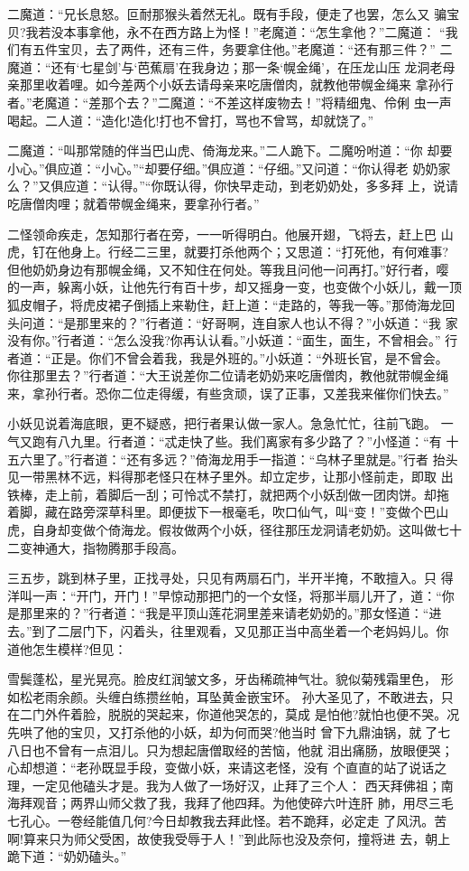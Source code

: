 二魔道：“兄长息怒。叵耐那猴头着然无礼。既有手段，便走了也罢，怎么又
骗宝贝?我若没本事拿他，永不在西方路上为怪！”老魔道：“怎生拿他？”二魔道：
“我们有五件宝贝，去了两件，还有三件，务要拿住他。”老魔道：“还有那三件？”
二魔道：“还有‘七星剑’与‘芭蕉扇’在我身边；那一条‘幌金绳’，在压龙山压
龙洞老母亲那里收着哩。如今差两个小妖去请母亲来吃唐僧肉，就教他带幌金绳来
拿孙行者。”老魔道：“差那个去？”二魔道：“不差这样废物去！”将精细鬼、伶俐
虫一声喝起。二人道：“造化!造化!打也不曾打，骂也不曾骂，却就饶了。”

二魔道：“叫那常随的伴当巴山虎、倚海龙来。”二人跪下。二魔吩咐道：“你
却要小心。”俱应道：“小心。”“却要仔细。”俱应道：“仔细。”又问道：“你认得老
奶奶家么？”又俱应道：“认得。”“你既认得，你快早走动，到老奶奶处，多多拜
上，说请吃唐僧肉哩；就着带幌金绳来，要拿孙行者。”

二怪领命疾走，怎知那行者在旁，一一听得明白。他展开翅，飞将去，赶上巴
山虎，钉在他身上。行经二三里，就要打杀他两个；又思道：“打死他，有何难事?
但他奶奶身边有那幌金绳，又不知住在何处。等我且问他一问再打。”好行者，嘤
的一声，躲离小妖，让他先行有百十步，却又摇身一变，也变做个小妖儿，戴一顶
狐皮帽子，将虎皮裙子倒插上来勒住，赶上道：“走路的，等我一等。”那倚海龙回
头问道：“是那里来的？”行者道：“好哥啊，连自家人也认不得？”小妖道：“我
家没有你。”行者道：“怎么没我?你再认认看。”小妖道：“面生，面生，不曾相会。”
行者道：“正是。你们不曾会着我，我是外班的。”小妖道：“外班长官，是不曾会。
你往那里去？”行者道：“大王说差你二位请老奶奶来吃唐僧肉，教他就带幌金绳
来，拿孙行者。恐你二位走得缓，有些贪顽，误了正事，又差我来催你们快去。”

小妖见说着海底眼，更不疑惑，把行者果认做一家人。急急忙忙，往前飞跑。
一气又跑有八九里。行者道：“忒走快了些。我们离家有多少路了？”小怪道：“有
十五六里了。”行者道：“还有多远？”倚海龙用手一指道：“乌林子里就是。”行者
抬头见一带黑林不远，料得那老怪只在林子里外。却立定步，让那小怪前走，即取
出铁棒，走上前，着脚后一刮；可怜忒不禁打，就把两个小妖刮做一团肉饼。却拖
着脚，藏在路旁深草科里。即便拔下一根毫毛，吹口仙气，叫“变！”变做个巴山
虎，自身却变做个倚海龙。假妆做两个小妖，径往那压龙洞请老奶奶。这叫做七十
二变神通大，指物腾那手段高。

三五步，跳到林子里，正找寻处，只见有两扇石门，半开半掩，不敢擅入。只
得洋叫一声：“开门，开门！”早惊动那把门的一个女怪，将那半扇儿开了，道：“你
是那里来的？”行者道：“我是平顶山莲花洞里差来请老奶奶的。”那女怪道：“进
去。”到了二层门下，闪着头，往里观看，又见那正当中高坐着一个老妈妈儿。你
道他怎生模样?但见：

雪鬓蓬松，星光晃亮。脸皮红润皱文多，牙齿稀疏神气壮。貌似菊残霜里色，
形如松老雨余颜。头缠白练攒丝帕，耳坠黄金嵌宝环。
孙大圣见了，不敢进去，只在二门外仵着脸，脱脱的哭起来，你道他哭怎的，莫成
是怕他?就怕也便不哭。况先哄了他的宝贝，又打杀他的小妖，却为何而哭?他当时
曾下九鼎油锅，就了七八日也不曾有一点泪儿。只为想起唐僧取经的苦恼，他就
泪出痛肠，放眼便哭；心却想道：“老孙既显手段，变做小妖，来请这老怪，没有
个直直的站了说话之理，一定见他磕头才是。我为人做了一场好汉，止拜了三个人：
西天拜佛祖；南海拜观音；两界山师父救了我，我拜了他四拜。为他使碎六叶连肝
肺，用尽三毛七孔心。一卷经能值几何?今日却教我去拜此怪。若不跪拜，必定走
了风汛。苦啊!算来只为师父受困，故使我受辱于人！”到此际也没及奈何，撞将进
去，朝上跪下道：“奶奶磕头。”

